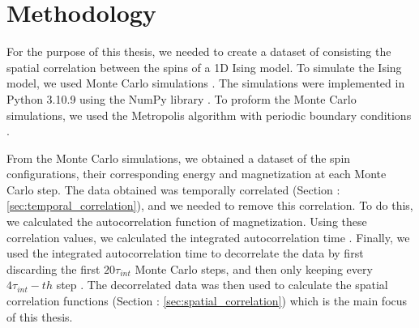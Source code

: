 \section{Methodology}
\label{sec:methodology}

For the purpose of this thesis, we needed to create a dataset of consisting the
spatial correlation between the spins of a 1D Ising model. To simulate the Ising
model, we used Monte Carlo simulations \cite{Landau2021,Andersen2019}. The
simulations were implemented in Python 3.10.9 \cite{Python3} using the NumPy
library \cite{2020NumPy-Array}. To proform the Monte Carlo simulations, we used
the Metropolis algorithm \cite{Metropolis1953} with periodic boundary conditions
\cite{Landau2021}. 

From the Monte Carlo simulations, we obtained a dataset of the spin
configurations, their corresponding energy and magnetization at each Monte Carlo
step. The data obtained was temporally correlated (Section :
\ref{sec:temporal_correlation}), and we needed to remove this correlation. To do
this, we calculated the autocorrelation function of magnetization. Using these
correlation values, we calculated the integrated autocorrelation time
\cite{Janke2006}. Finally, we used the integrated autocorrelation time to
decorrelate the data by first discarding the first $20\tau_{int}$ Monte Carlo
steps, and then only keeping every $4\tau_{int}-th$ step \cite{Chertenkov2023}.
The decorrelated data was then used to calculate the spatial correlation
functions (Section : \ref{sec:spatial_correlation}) which is the main focus of
this thesis.
